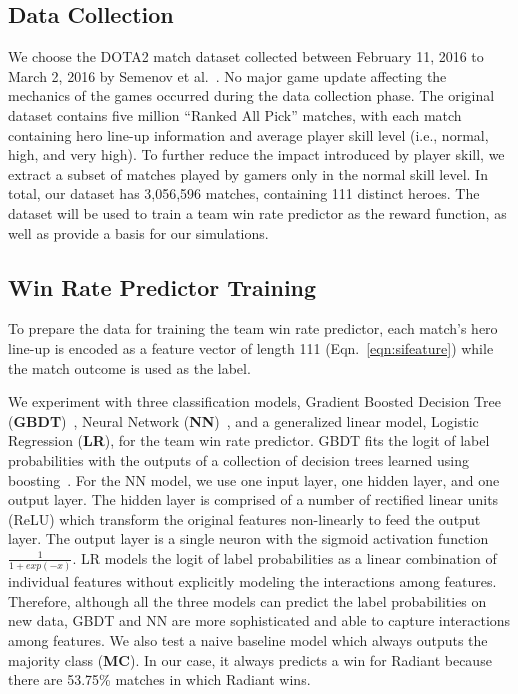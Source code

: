 \subsection{Data Collection}
We choose the DOTA2 match dataset collected between February 11, 2016 to March 2, 2016 by Semenov et al.~\cite{Semenov2016}. No major game update affecting the mechanics of the games occurred during the data collection phase. The original dataset contains five million ``Ranked All Pick'' matches, with each match containing hero line-up information and average player skill level (i.e., normal, high, and very high). To further reduce the impact introduced by player skill, 
we extract a subset of matches played by gamers only in the normal skill level. In total, our dataset has 3,056,596 matches, containing 111 distinct heroes. The dataset will be used to train a team win rate predictor as the reward function, as well as provide a basis for our simulations.

\subsection{Win Rate Predictor Training}


To prepare the data for training the team win rate predictor, each match's hero line-up is encoded as a feature vector of length 111 (Eqn.~\ref{eqn:sifeature}) while the match outcome is used as the label. 

We experiment with three classification models, Gradient Boosted Decision Tree (\textbf{GBDT})~\cite{friedman2001greedy}, Neural Network (\textbf{NN})~\cite{bishop2006pattern}, and a generalized linear model, Logistic Regression (\textbf{LR}), for the team win rate predictor. GBDT fits the logit of label probabilities with the outputs of a collection of decision trees learned using boosting~\cite{friedman2000additive}. For the NN model, we use one input layer, one hidden layer, and one output layer. The hidden layer is comprised of a number of rectified linear units (ReLU) which transform the original features non-linearly to feed the output layer. The output layer is a single neuron with the sigmoid activation function $\frac{1}{1+exp(-x)}$. 
LR models the logit of label probabilities as a linear combination of individual features without explicitly modeling the interactions among features. Therefore, although all the three models can predict the label probabilities on new data, GBDT and NN are more sophisticated and able to capture interactions among features. We also test a naive baseline model which always outputs the majority class (\textbf{MC}). In our case, it always predicts a win for Radiant because there are 53.75\%  matches in which Radiant wins. 


